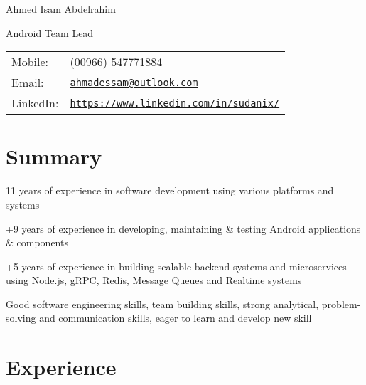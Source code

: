 \documentclass[letterpaper]{article}
\def\name{Ahmed Isam Abdelrahim}
\renewenvironment{itemize}{
  \begin{list}{}{
    \setlength{\leftmargin}{1.5em}
  }
}{
  \end{list}
}
\begin{document}
{\huge \name}


\vspace{0.10in}

\begin{minipage}{0.45\linewidth}
  Android Team Lead \\
 
\end{minipage}
\begin{minipage}{0.45\linewidth}
  \begin{tabular}{ll}
    Mobile: & (00966) 547771884 \\
    Email: & \href{mailto:ahmadessam@outlook.com}{\tt ahmadessam@outlook.com} \\
    LinkedIn: & \href{https://www.linkedin.com/in/sudanix/}{\tt https://www.linkedin.com/in/sudanix/} \\
  \end{tabular}
\end{minipage}

\section*{Summary}
\begin{itemize}
\item 11 years of experience in software development using various platforms and systems 
\item +9 years of experience in developing, maintaining \& testing Android applications \& components
\item +5 years of experience in building scalable backend systems and microservices using Node.js, gRPC, Redis, Message Queues and Realtime systems
\item Good software engineering skills, team building skills, strong analytical, problem-solving and communication skills, eager to learn and develop new skill
\end{itemize}


\section*{Experience}
\end{document}
